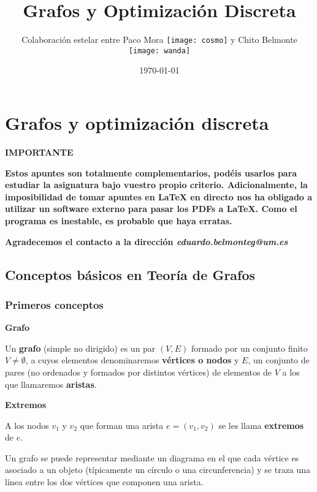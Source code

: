 \documentclass[openany]{book}
\title{Grafos y Optimización Discreta}
\author{Colaboración estelar entre Paco Mora \texttt{[image: cosmo]} y Chito Belmonte \texttt{[image: wanda]}}
\date{\today}
\begin{document}
\maketitle

\tableofcontents


\part{Grafos y optimización discreta}

\textbf{IMPORTANTE}

\textbf{Estos apuntes son totalmente complementarios, podéis usarlos para estudiar la asignatura bajo vuestro propio criterio. Adicionalmente, la imposibilidad de tomar apuntes en LaTeX en directo nos ha obligado a utilizar un software externo para pasar los PDFs a LaTeX. Como el programa es inestable, es probable que haya erratas.}

\textbf{Agradecemos el contacto a la dirección \textit{eduardo.belmonteg@um.es}}

\chapter{Conceptos básicos en Teoría de Grafos}

\section{Primeros conceptos}


\begin{definition}
  { \color{turquoise} \textbf{Grafo}}

  Un \textbf{grafo} (simple no dirigido) es un par $(V,E)$ formado por un conjunto finito $V \ne \emptyset$, a cuyos elementos denominaremos \textbf{vértices o nodos} y $E$, un conjunto de pares (no ordenados y formados por distintos vértices) de elementos de $V$  a los que llamaremos \textbf{aristas}.
\end{definition}

\begin{definition}
  { \color{turquoise} \textbf{Extremos}}

  A los nodos $ v_1 $ y $ v_2 $ que forman una arista $e=(v_1, v_2)$ se les llama \textbf{extremos} de $ e $.
\end{definition}

Un grafo se puede representar mediante un diagrama en el que cada vértice es asociado a un objeto (típicamente un círculo o una circunferencia) y se traza una línea entre los dos vértices que componen una arista.
\end{document}

